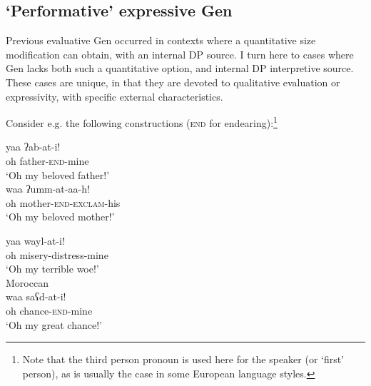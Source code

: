 \subsection{`Performative' expressive Gen}

Previous evaluative Gen occurred in contexts where a quantitative size
modification can obtain, with an internal DP source. I turn here to cases where
Gen lacks both such a quantitative option, and internal DP interpretive source.
These cases are unique, in that they are devoted to qualitative evaluation or
expressivity, with specific external characteristics.

Consider e.g. the following constructions (\textsc{end} for
endearing):\footnote{Note that the third person pronoun  is used here
for the speaker (or `first' person), as is usually the case in some European
language styles.}

\begin{exe}
  \ex\label{ex:fassi:43}
  \gll yaa ʔab-at-i!\\
  oh father-\textsc{end}-mine\\
  \glt `Oh my beloved father!'\\
  \ex\label{ex:fassi:44} %
  \gll waa ʔumm-at-aa-h!\\
  oh mother-\textsc{end-exclam}-his\\
  \glt `Oh my beloved mother!'\\
  \ex\label{ex:fassi:45}
  \begin{xlist}
    \ex\label{ex:fassi:45a}
    \gll yaa wayl-at-i!\\
    oh misery-distress-mine\\
    \glt `Oh my terrible woe!'\\
    \ex\label{ex:fassi:45b} Moroccan \\
    \gll waa saʕd-at-i!\\
    oh chance-\textsc{end}-mine\\
    \glt `Oh my great chance!'\\
  \end{xlist}
\end{exe}

